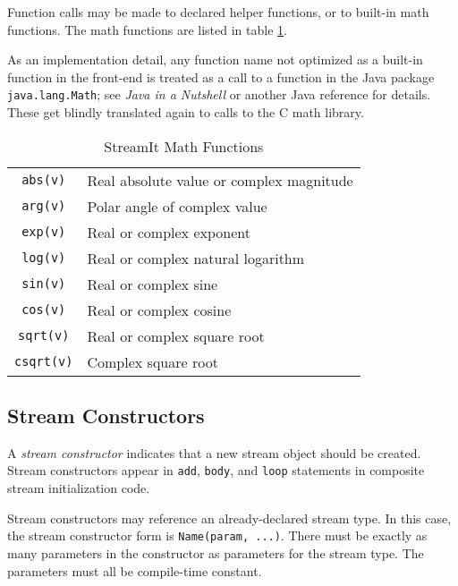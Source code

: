 \documentclass[11pt]{article}
\begin{document}
Function calls may be made to declared helper functions, or to
built-in math functions.  The math functions are listed in table
\ref{tab:math-functions}.

\begin{note}
As an implementation detail, any function name not optimized as a
built-in function in the front-end is treated as a call to a function
in the Java package \lstinline|java.lang.Math|; see \emph{Java in a
  Nutshell} or another Java reference for details.  These get blindly
translated again to calls to the C math library.
\end{note}

\begin{table}[htbp]
  \begin{center}
    \begin{tabular}{cl}
      \toprule
      \texttt{abs(v)} & Real absolute value or complex magnitude \\
      \texttt{arg(v)} & Polar angle of complex value \\
      \texttt{exp(v)} & Real or complex exponent \\
      \texttt{log(v)} & Real or complex natural logarithm \\
      \texttt{sin(v)} & Real or complex sine \\
      \texttt{cos(v)} & Real or complex cosine \\
      \texttt{sqrt(v)} & Real or complex square root \\
      \texttt{csqrt(v)} & Complex square root \\
      \bottomrule
    \end{tabular}
    \caption{StreamIt Math Functions}
    \label{tab:math-functions}
  \end{center}
\end{table}

\subsection{Stream Constructors}
\label{sec:expr-stream-constructor}

A \emph{stream constructor} indicates that a new stream object should
be created.  Stream constructors appear in \lstinline|add|,
\lstinline|body|, and \lstinline|loop| statements in composite stream
initialization code.

Stream constructors may reference an already-declared stream type.  In
this case, the stream constructor form is \lstinline|Name(param, ...)|.
There must be exactly as many parameters in the constructor as
parameters for the stream type.  The parameters must all be
compile-time constant.
\end{document}
